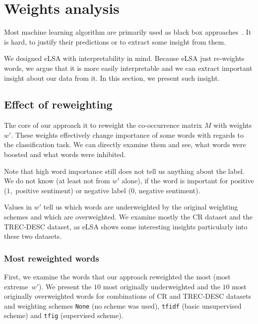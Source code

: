 \section{Weights analysis} \label{chap:weight:analysis}

    Most machine learning algorithm are primarily used as black box approaches~\cite{ribeiro2016should}. %
    It is hard, to justify their predictions or to extract some insight from them. 
    
    We designed eLSA with interpretability in mind.
    Because eLSA just re-weights words, we argue that it is more easily interpretable and we can extract important insight about our data from it.
    In this section, we present such insight.
    
    \subsection{Effect of reweighting}
    The core of our approach it to reweight the co-occurrence matrix $M$ with weights $w'$. 
    These weights effectively change importance of some words with regards to the classification task.
    We can directly examine them and see, what words were boosted and what words were inhibited.
    
    Note that high word importance still does not tell us anything about the label. 
    We do not know (at least not from $w'$ alone), if the word is important for positive ($1$,~positive sentiment) or negative label ($0$, negative sentiment).
    
    Values in $w'$ tell us which words are underweighted by the original weighting schemes and which are overweighted.
    We examine mostly the CR dataset and the TREC-DESC dataset, as eLSA shows some interesting insights particularly into these two datasets.

    \subsubsection{Most reweighted words}
    
    First, we examine the words that our approach reweighted the most (most extreme~$w'$).
    We present the $10$ most originally underweighted and the $10$ most originally overweighted words for combinations of CR and TREC-DESC datasets and weighting schemes \texttt{None} (no scheme was used), \texttt{tfidf} (basic unsupervised scheme) and \texttt{tfig} (supervised scheme).
    

